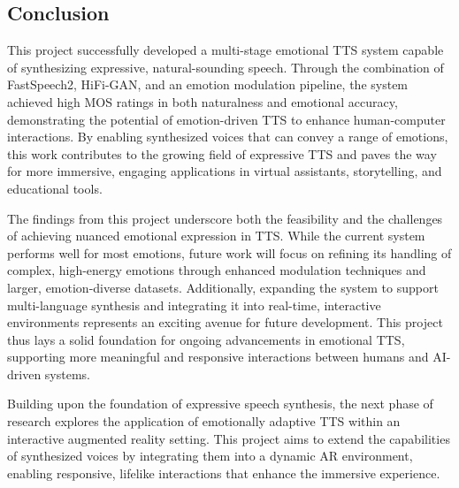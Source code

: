 \subsection{Conclusion}
This project successfully developed a multi-stage emotional TTS system capable of synthesizing expressive, natural-sounding speech. Through the combination of FastSpeech2, HiFi-GAN, and an emotion modulation pipeline, the system achieved high MOS ratings in both naturalness and emotional accuracy, demonstrating the potential of emotion-driven TTS to enhance human-computer interactions. By enabling synthesized voices that can convey a range of emotions, this work contributes to the growing field of expressive TTS and paves the way for more immersive, engaging applications in virtual assistants, storytelling, and educational tools.

The findings from this project underscore both the feasibility and the challenges of achieving nuanced emotional expression in TTS. While the current system performs well for most emotions, future work will focus on refining its handling of complex, high-energy emotions through enhanced modulation techniques and larger, emotion-diverse datasets. Additionally, expanding the system to support multi-language synthesis and integrating it into real-time, interactive environments represents an exciting avenue for future development. This project thus lays a solid foundation for ongoing advancements in emotional TTS, supporting more meaningful and responsive interactions between humans and AI-driven systems.

Building upon the foundation of expressive speech synthesis, the next phase of research explores the application of emotionally adaptive TTS within an interactive augmented reality setting. This project aims to extend the capabilities of synthesized voices by integrating them into a dynamic AR environment, enabling responsive, lifelike interactions that enhance the immersive experience.
